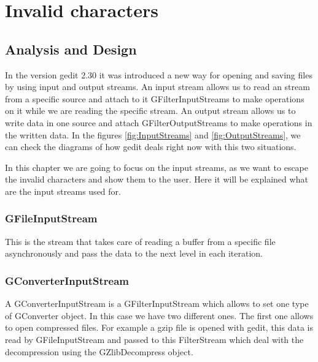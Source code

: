 
\chapter{Invalid characters}

\section{Analysis and Design}

In the version gedit 2.30 it was introduced a new way for opening and saving files by using input and output streams. An input stream allows us to read an stream from a specific source and attach to it GFilterInputStreams to make operations on it while we are reading the specific stream. An output stream allows us to write data in one source and attach GFilterOutputStreams to make operations in the written data. In the figures \ref{fig:InputStreams} and \ref{fig:OutputStreams}, we can check the diagrams of how gedit deals right now with this two situations.



In this chapter we are going to focus on the input streams, as we want to escape the invalid characters and show them to the user. Here it will be explained what are the input streams used for.

\subsection*{GFileInputStream}

This is the stream that takes care of reading a buffer from a specific file asynchronously and pass the data to the next level in each iteration.

\subsection*{GConverterInputStream}

A GConverterInputStream is a GFilterInputStream which allows to set one type of GConverter object. In this case we have two different ones. The first one allows to open compressed files. For example a gzip file is opened with gedit, this data is read by GFileInputStream and passed to this FilterStream which deal with the decompression using the GZlibDecompress object.

